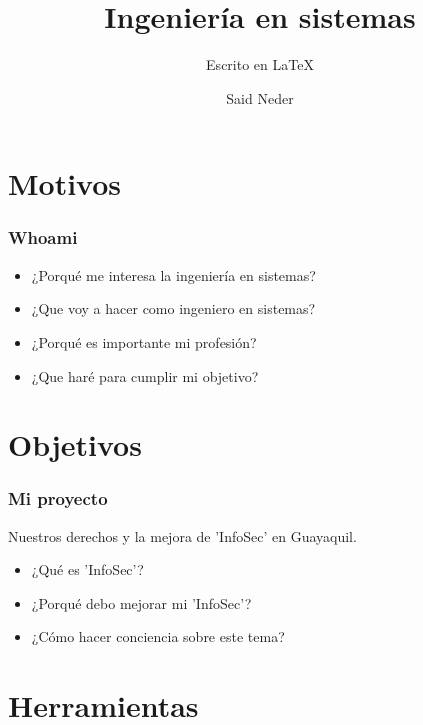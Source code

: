 \documentclass{beamer}
\title{Ingeniería en sistemas}
\author{Said Neder}
\subtitle{Escrito en \LaTeX}
\institute[\href{https://www.soler.edu.ec/}{Soler Lux Dei}]{Soler Lux Dei\\ \href{https://github.com/crazyc4t/presentacionppe}{\tiny https://github.com/crazyc4t/presentacionppe}}
\begin{document}
\maketitle

\section{Motivos}

\begin{frame}
\frametitle{Whoami}

\begin{itemize}
\item ¿Porqué me interesa la ingeniería en sistemas?
\item ¿Que voy a hacer como ingeniero en sistemas?
\item ¿Porqué es importante mi profesión?
\item ¿Que haré para cumplir mi objetivo?
\end{itemize}

\end{frame}

\section{Objetivos}

\begin{frame}
\frametitle{Mi proyecto}

Nuestros derechos y la mejora de 'InfoSec' en Guayaquil.\\

\begin{itemize}
\item ¿Qué es 'InfoSec'?
\item ¿Porqué debo mejorar mi 'InfoSec'?
\item ¿Cómo hacer conciencia sobre este tema?
\end{itemize}

\end{frame}

\section{Herramientas}
\end{document}
